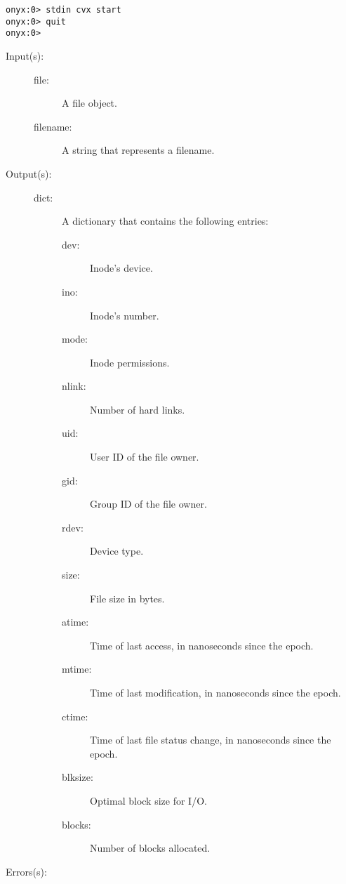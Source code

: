 \begin{description}
\begin{description}
\begin{verbatim}
onyx:0> stdin cvx start
onyx:0> quit
onyx:0>
		\end{verbatim}
	\end{description}
\label{systemdict:status}
\item[{\onyxop{file/filename}{status}{dict}}: ]
	\begin{description}\item[]
	\item[Input(s): ]
		\begin{description}\item[]
		\item[file: ]
			A file object.
		\item[filename: ]
			A string that represents a filename.
		\end{description}
	\item[Output(s): ]
		\begin{description}\item[]
		\item[dict: ]
			A dictionary that contains the following entries:
			\begin{description}\item[]
			\item[dev: ]
				Inode's device.
			\item[ino: ]
				Inode's number.
			\item[mode: ]
				Inode permissions.
			\item[nlink: ]
				Number of hard links.
			\item[uid: ]
				User ID of the file owner.
			\item[gid: ]
				Group ID of the file owner.
			\item[rdev: ]
				Device type.
			\item[size: ]
				File size in bytes.
			\item[atime: ]
				Time of last access, in nanoseconds since the
				epoch.
			\item[mtime: ]
				Time of last modification, in nanoseconds since
				the epoch.
			\item[ctime: ]
				Time of last file status change, in nanoseconds
				since the epoch.
			\item[blksize: ]
				Optimal block size for I/O.
			\item[blocks: ]
				Number of blocks allocated.
			\end{description}
		\end{description}
	\item[Errors(s): ]
		\begin{description}\item[]

\end{description}
\end{description}
\end{description}

